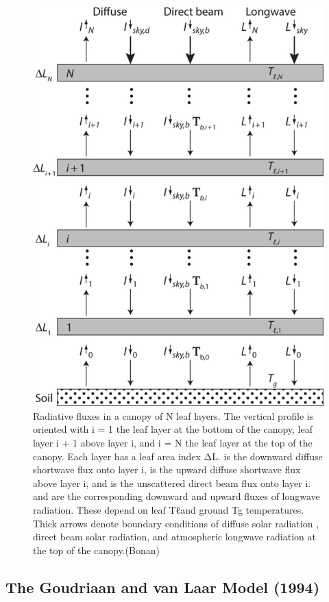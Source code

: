 \documentclass[
  12pt,
  oneside]{book}
\begin{document}
\begin{figure}

{\centering \includegraphics[width=0.8\linewidth]{figures/chap3/f319_Norman} 

}

\caption{Radiative fluxes in a canopy of N leaf layers. The vertical profile is oriented with i = 1 the leaf layer at the bottom of the canopy, leaf layer i + 1 above layer i, and i = N the leaf layer at the top of the canopy. Each layer has a leaf area index ΔL. is the downward diffuse shortwave flux onto layer i, is the upward diffuse shortwave flux above layer i, and is the unscattered direct beam flux onto layer i. and are the corresponding downward and upward fluxes of longwave radiation. These depend on leaf Tℓand ground Tg temperatures. Thick arrows denote boundary conditions of diffuse solar radiation , direct beam solar radiation, and atmospheric longwave radiation at the top of the canopy.(Bonan)}\label{fig:f319}
\end{figure}

\hypertarget{the-goudriaan-and-van-laar-model-1994}{%
\subsection{The Goudriaan and van Laar Model (1994)}\label{the-goudriaan-and-van-laar-model-1994}}
\end{document}

